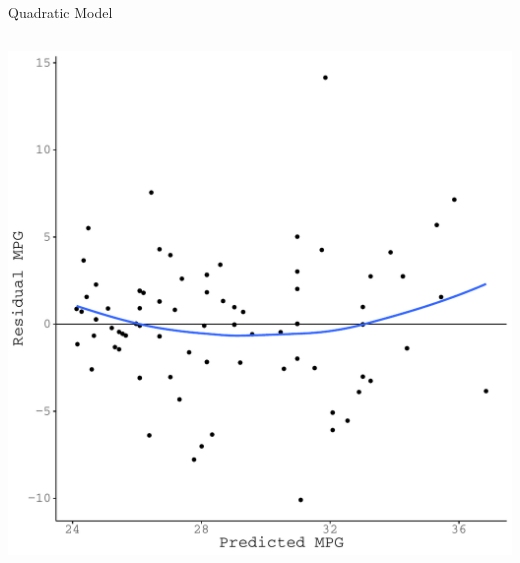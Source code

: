 \documentclass{beamer}\usepackage[]{graphicx}\usepackage[]{color}
\makeatletter
\def\maxwidth{ %
  \ifdim\Gin@nat@width>\linewidth
    \linewidth
  \else
    \Gin@nat@width
  \fi
}
\newenvironment{knitrout}{}{} %
\makeatother
\begin{document}
\begin{frame}{Quadratic Model}
\begin{columns}
\begin{column}{0.5\textwidth}
\begin{knitrout}
{\centering \includegraphics[width=\maxwidth]{figure/unnamed-chunk-46-1} 

}



\end{knitrout}

\end{column}
\end{columns}
  
\end{frame}

\end{document}
